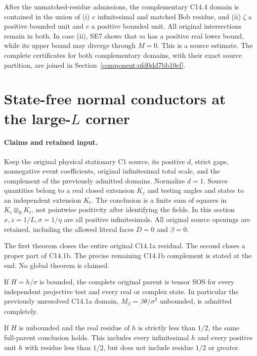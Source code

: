 After the unmatched-residue admissions, the complementary C14.4 domain is contained in the union of (i) $e$ infinitesimal and matched Bob residue, and (ii) $\zeta$ a positive bounded unit and $e$ a positive bounded unit. All original intersections remain in both. In case (ii), SE7 shows that $m$ has a positive real lower bound, while its upper bound may diverge through $M=0$. This is a source estimate. The complete certificates for both complementary domains, with their exact source partition, are joined in Section~\ref{component:pfd0dd7bb10cf}.


\section{\texorpdfstring{State-free normal conductors at the large-$L$ corner}{State-free normal conductors at the large-L corner}}
\label{component:p3be5a8005801}

\label{p3be5a8005801:sec:c141-state-free}

\paragraph{Claims and retained input.}
Keep the original physical stationary C1 source, its positive $d$,
strict gaps, nonnegative event coefficients, original infinitesimal
total scale, and the complement of the previously admitted domains.
Normalize $d=1$. Source quantities belong to a real closed extension
$K_c$ and testing angles and states to an independent extension $K_t$.
The conclusion is a finite sum of squares in
$K_c\otimes_{\mathbb R}K_t$, not pointwise positivity after identifying
the fields. In this section $x,z=1/L,\sigma=1/\eta$ are all positive
infinitesimals. All original source openings are retained, including
the allowed literal faces $D=0$ and $\beta=0$.

The first theorem closes the entire original C14.1a residual. The
second closes a proper part of C14.1b. The precise remaining C14.1b
complement is stated at the end. No global theorem is claimed.

\begin{theorem}[C14.1a]
If $H=h/\sigma$ is bounded, the complete original parent is tensor
SOS for every independent projective test and every real or complex
state. In particular the previously unresolved C14.1a domain,
$M_\beta=\beta\theta/\sigma^2$ unbounded, is admitted completely.
\end{theorem}

\begin{theorem}
If $H$ is unbounded and the real residue of $h$ is strictly less
than $1/2$, the same full-parent conclusion holds. This includes
every infinitesimal $h$ and every positive unit $h$ with residue
less than $1/2$, but does not include residue $1/2$ or greater.
\end{theorem}

